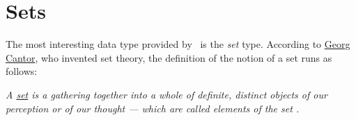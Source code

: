 \section{Sets}
The most interesting data type provided by \setlx\ is the \emph{set} type.  
According to \href{https://en.wikipedia.org/wiki/Georg_Cantor}{Georg Cantor}, who invented set
theory, the definition of the notion of a set runs as follows:
\vspace*{0.4cm}

\begin{minipage}{0.8\linewidth}
\textsl{A \href{https://en.wikipedia.org/wiki/Set_(mathematics)}{\emph{set}} is 
a gathering together into a whole of definite, distinct objects of our perception or of our thought
--- which are called elements of the set \cite{cantor:1895}.}
\end{minipage}
\vspace*{0.4cm}

